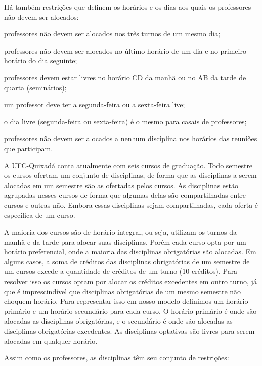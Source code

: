 Há também restrições que definem os horários e os dias aos quais os professores não devem ser alocados:

\begin{alineascomponto}
\item professores não devem ser alocados nos três turnos de um mesmo dia;
\item professores não devem ser alocados no último horário de um dia e no primeiro horário do dia seguinte;
\item professores devem estar livres no horário CD da manhã ou no AB da tarde de quarta (seminários);
\item um professor deve ter a segunda-feira ou a sexta-feira live;
\item o dia livre (segunda-feira ou sexta-feira) é o mesmo para casais de professores;
\item professores não devem ser alocados a nenhum disciplina nos horários das reuniões que participam.
\end{alineascomponto}

A UFC-Quixadá conta atualmente com seis cursos de graduação. Todo semestre os cursos ofertam um conjunto de disciplinas, de forma que as disciplinas a serem alocadas em um semestre são as ofertadas pelos cursos. As disciplinas estão agrupadas nesses cursos de forma que algumas delas são compartilhadas entre cursos e outras não. Embora essas disciplinas sejam compartilhadas, cada oferta é específica de um curso. 

A maioria dos cursos são de horário integral, ou seja, utilizam os turnos da manhã e da tarde para alocar suas disciplinas. Porém cada curso opta por um horário preferencial, onde a maioria das disciplinas obrigatórias são alocadas. Em alguns casos, a soma de créditos das disciplinas obrigatórias de um semestre de um cursos excede a quantidade de créditos de um turno (10 créditos). Para resolver isso os cursos optam por alocar os créditos excedentes em outro turno, já que é imprescindível que disciplinas obrigatórias de um mesmo semestre não choquem horário. Para representar isso em nosso modelo definimos um horário primário e um horário secundário para cada curso. O horário primário é onde são alocadas as disciplinas obrigatórias, e o secundário é onde são alocadas as disciplinas obrigatórias excedentes. As disciplinas optativas são livres para serem alocadas em qualquer horário.

Assim como os professores, as disciplinas têm seu conjunto de restrições:

